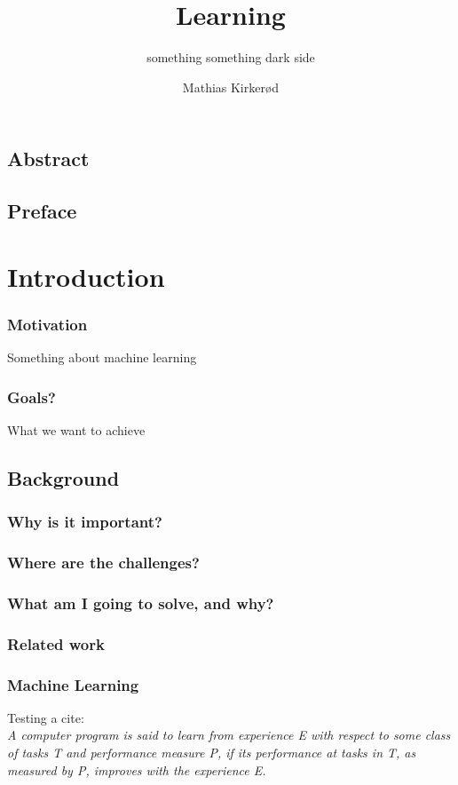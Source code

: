 \documentclass[a4paper,english]{ifimaster}
\title{Learning}
\subtitle{something something dark side}
\author{Mathias Kirkerød}
\begin{document}
\duoforside[dept={Department of Informatics},
program={Informatics: Language and Communication},
long]

\frontmatter{}
\chapter*{Abstract}

\tableofcontents{}
\listoffigures{}
\listoftables{}

\chapter*{Preface}

\mainmatter{}
\part{Introduction}
	\section{Motivation}
		Something about machine learning 
	\section{Goals?}
		What we want to achieve
\chapter{Background}
	\section{Why is it important?}
	\section{Where are the challenges?}
	\section{What am I going to solve, and why?}
	\section{Related work}
	
	\section{Machine Learning}
		Testing a cite:\\
		\textit{ A computer program is said to learn from experience E with respect to
some class of tasks T and performance measure P, if its performance at
tasks in T, as measured by P, improves with the experience E. } 
		\cite{MitchellTomM1997Ml}
\end{document}
